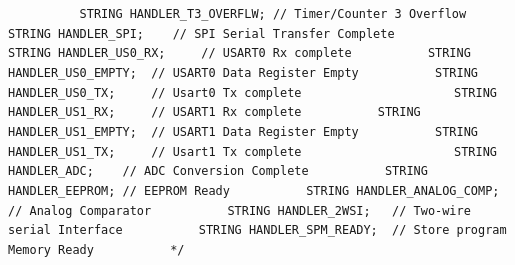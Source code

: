 {{{{\lstinline!          STRING HANDLER_T3_OVERFLW;	// Timer/Counter 3 Overflow! \newline
\lstinline!! \newline
\lstinline!          STRING HANDLER_SPI; 	// SPI Serial Transfer Complete! \newline
\lstinline!          ! \newline
\lstinline!          STRING HANDLER_US0_RX;  	// USART0 Rx complete! \newline
\lstinline!          STRING HANDLER_US0_EMPTY;	// USART0 Data Register Empty! \newline
\lstinline!          STRING HANDLER_US0_TX;  	// Usart0 Tx complete! \newline
\lstinline!          ! \newline
\lstinline!          STRING HANDLER_US1_RX;  	// USART1 Rx complete! \newline
\lstinline!          STRING HANDLER_US1_EMPTY;	// USART1 Data Register Empty! \newline
\lstinline!          STRING HANDLER_US1_TX;  	// Usart1 Tx complete! \newline
\lstinline!          ! \newline
\lstinline!          STRING HANDLER_ADC; 	// ADC Conversion Complete! \newline
\lstinline!          STRING HANDLER_EEPROM;	// EEPROM Ready! \newline
\lstinline!          STRING HANDLER_ANALOG_COMP;	// Analog Comparator! \newline
\lstinline!          STRING HANDLER_2WSI;	// Two-wire serial Interface! \newline
\lstinline!          STRING HANDLER_SPM_READY;	// Store program Memory Ready! \newline
\lstinline!          */! \newline
\lstinline!          ! \newline
}}}}
